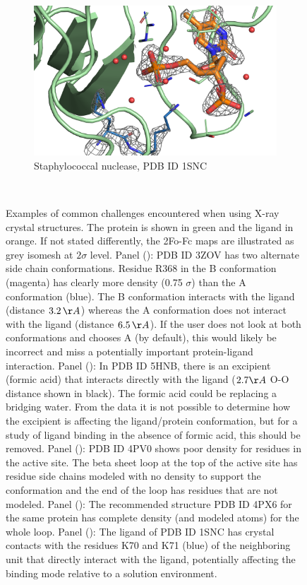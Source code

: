\documentclass[9pt,bestpractices]{livecoms}
\begin{document}
\begin{figure}
    \begin{subfigure}[b]{0.48\textwidth}
        \centering
        \includegraphics[width=\textwidth]{figures/crystal/pic_1snc.png}
        \caption{Staphylococcal nuclease, PDB ID 1SNC}
        \label{fig:1snc}
    \end{subfigure}
    \hfill ~\\
    
    \caption{Examples of common challenges encountered when using X-ray crystal structures. The protein is shown in green and the ligand in orange. If not stated differently, the 2Fo-Fc maps are illustrated as grey isomesh at $2\sigma$ level. 
    Panel (): PDB ID 3ZOV has two
    alternate side chain conformations. Residue R368 in the B conformation (magenta) has clearly more density (0.75 $\sigma$) than the A conformation (blue). The B conformation interacts with the ligand (distance $3.2\,\AA$) whereas the A conformation does not interact with the ligand (distance $6.5\,\AA$). If the user does not look at both conformations and chooses A (by default), this would likely be incorrect and miss a potentially important protein-ligand interaction.  
    Panel (): In PDB ID 5HNB, there is an excipient (formic acid) that interacts directly with the ligand ($2.7 \AA$ O-O distance shown in black).  The formic acid could be replacing a bridging water.  From the data it is not possible to determine how the excipient is affecting the ligand/protein conformation, but for a study of ligand binding in the absence of formic acid, this should be removed.
    Panel (): PDB ID 4PV0  shows poor density for residues in the active site.  The beta sheet loop at the top of the active site has residue side chains modeled with no density to support the conformation and the end of the loop has residues that are not modeled.  
    Panel (): The recommended structure PDB ID 4PX6 for the same protein  has complete density (and modeled atoms) for the whole loop.
    Panel (): The ligand of PDB ID 1SNC has crystal contacts with the residues K70 and K71 (blue) of the neighboring unit that directly interact with the ligand, potentially affecting the binding mode relative to a solution environment.
    }
    \label{fig:crystal1}
\end{figure}
\end{document}
